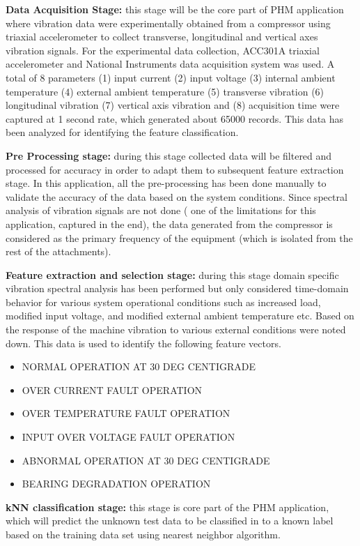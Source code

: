 \documentclass[sigconf]{acmart}
\begin{document}
\textbf{Data Acquisition Stage:} this stage will be the core part of PHM application where vibration data were experimentally obtained from a compressor using triaxial accelerometer to collect transverse, longitudinal and vertical axes vibration signals. For the experimental data collection, ACC301A triaxial accelerometer and National Instruments data acquisition system was used. A total of 8 parameters (1) input current (2) input voltage (3) internal ambient temperature (4) external ambient temperature (5) transverse vibration (6) longitudinal vibration (7) vertical axis vibration and (8) acquisition time were captured at 1 second rate, which generated about 65000 records. This data has been analyzed for identifying the feature classification.

\textbf{Pre Processing stage:} during this stage collected data will be filtered and processed for accuracy in order to adapt them to subsequent feature extraction stage. In this application, all the pre-processing has been done manually to validate the accuracy of the data based on the system conditions. Since spectral analysis of vibration signals are not done ( one of the limitations for this application, captured in the end), the data generated from the compressor is considered as the primary frequency of the equipment (which is isolated from the rest of the attachments).

\textbf{Feature extraction and selection stage:} during this stage domain specific vibration spectral analysis has been performed but only considered time-domain behavior for various system operational conditions such as increased load, modified input voltage, and modified external ambient temperature etc. Based on the response of the machine vibration to various external conditions were noted down. This data is used to identify the following feature vectors.
\begin{itemize}
\item NORMAL OPERATION AT 30 DEG CENTIGRADE
\item OVER CURRENT FAULT OPERATION
\item OVER TEMPERATURE FAULT OPERATION
\item INPUT OVER VOLTAGE FAULT OPERATION
\item ABNORMAL OPERATION AT 30 DEG CENTIGRADE
\item BEARING DEGRADATION OPERATION
\end{itemize}

\textbf{kNN classification stage:} this stage is core part of the PHM application, which will predict the unknown test data to be classified in to a known label based on the training data set using nearest neighbor algorithm.
\end{document}
